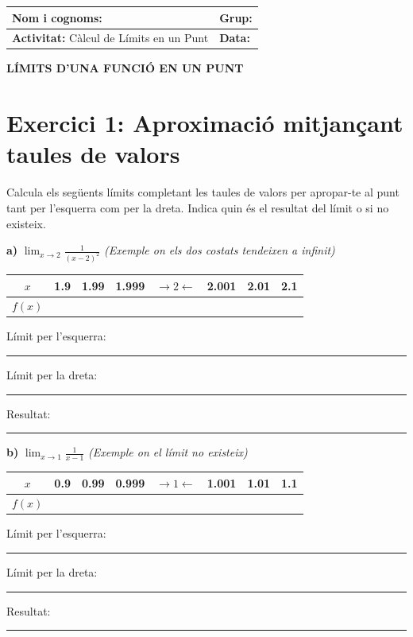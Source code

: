 \documentclass[12pt,a4paper]{article}
\begin{document}
\begingroup
\renewcommand{\arraystretch}{2.2}
\begin{tabularx}{\textwidth}{|X|p{4cm}|}
    \hline
    \textbf{Nom i cognoms:} & \textbf{Grup:} \\ \hline
    \textbf{Activitat:} Càlcul de Límits en un Punt & \textbf{Data:} \\ \hline
\end{tabularx}
\endgroup

\vspace{0.8cm}

\begin{center}
    {\Large \textbf{LÍMITS D'UNA FUNCIÓ EN UN PUNT}}
\end{center}

\vspace{0.5cm}

\section*{Exercici 1: Aproximació mitjançant taules de valors}
Calcula els següents límits completant les taules de valors per apropar-te al punt tant per l'esquerra com per la dreta. Indica quin és el resultat del límit o si no existeix.

\vspace{0.3cm}
\textbf{a)} $\lim_{x \to 2} \frac{1}{(x-2)^2}$ \textit{(Exemple on els dos costats tendeixen a infinit)}

\begin{center}
\begin{tabular}{|c|c|c|c|c|c|c|c|}
\hline
$x$ & 1.9 & 1.99 & 1.999 & $\rightarrow 2 \leftarrow$ & 2.001 & 2.01 & 2.1 \\
\hline
$f(x)$ & & & & & & & \\
\hline
\end{tabular}
\end{center}
Límit per l'esquerra: \rule{2cm}{0.1mm} \hspace{1cm} Límit per la dreta: \rule{2cm}{0.1mm} \hspace{1cm} Resultat: \rule{2cm}{0.1mm}

\vspace{0.5cm}
\textbf{b)} $\lim_{x \to 1} \frac{1}{x-1}$ \textit{(Exemple on el límit no existeix)}

\begin{center}
\begin{tabular}{|c|c|c|c|c|c|c|c|}
\hline
$x$ & 0.9 & 0.99 & 0.999 & $\rightarrow 1 \leftarrow$ & 1.001 & 1.01 & 1.1 \\
\hline
$f(x)$ & & & & & & & \\
\hline
\end{tabular}
\end{center}
Límit per l'esquerra: \rule{2cm}{0.1mm} \hspace{1cm} Límit per la dreta: \rule{2cm}{0.1mm} \hspace{1cm} Resultat: \rule{2cm}{0.1mm}
\end{document}
